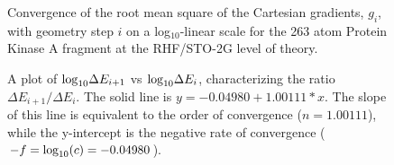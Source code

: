 \documentclass[prl,aps,preprint,superbib,12pt]{revtex4}
\begin{document}
{\begin{figure}[h]
\caption{
Convergence of the root mean square of the Cartesian gradients, $g_{i}$,
with geometry step $i$ on a log$_{10}$-linear  scale for the 
263 atom Protein Kinase A fragment at the RHF/STO-2G level of theory.}\label{gradientpicture} 
\end{figure}

\begin{figure}[h]
\caption{A plot of ${\rm log}_{10} \Delta E_{i+1}$ vs  ${\rm log}_{10} \Delta E_{i}$,  characterizing the ratio 
         $\Delta E_{i+1}/\Delta E_i$.  The solid line is $y=-0.04980+1.00111 *x$. 
         The slope  of this line is equivalent to the order of convergence ($n=1.00111$), 
         while the y-intercept is the negative rate of convergence ($-f ={\rm log}_{10}(c)= -0.04980$).}
\label{loglogplot}
\end{figure}

}
\end{document}
